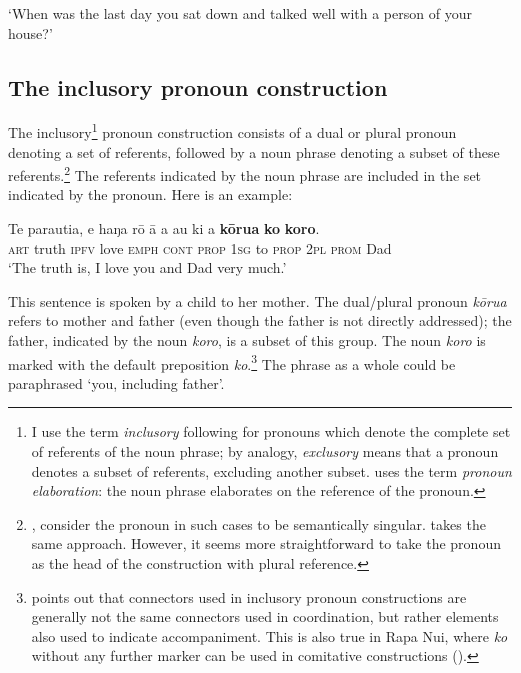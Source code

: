 \glt 
‘When was the last day you sat down and talked well with a person of your house?’ \textstyleExampleref{[R209.032]} 
\z

\subsection{The inclusory pronoun construction}\label{sec:8.10.7}
The inclusory\footnote{\label{fn:449}I use the term \textit{inclusory} following \citet{Lichtenberk2000} for pronouns which denote the complete set of referents of the noun phrase; by analogy, \textit{exclusory} means that a pronoun denotes a subset of referents, excluding another subset. \citet[207]{Dixon2010-2} uses the term \textit{pronoun elaboration}: the noun phrase elaborates on the reference of the pronoun.} pronoun construction consists of a dual or plural pronoun denoting a set of referents, followed by a noun phrase denoting a subset of these referents.\footnote{\label{fn:450}\citet[267]{AndersonKeenan1985}, consider the pronoun in such cases to be semantically singular. \citet{Schwartz1988} takes the same approach. However, it seems more straightforward to take the pronoun as the head of the construction with plural reference.}  The referents indicated by the noun phrase are included in the set indicated by the pronoun. Here is an example:

\ea\label{ex:8.211}
\gll Te parauti{\ꞌ}a, e haŋa rō {\ꞌ}ā a au ki a \textbf{kōrua} \textbf{ko} \textbf{koro}. \\
\textsc{art} truth \textsc{ipfv} love \textsc{emph} \textsc{cont} \textsc{prop} \textsc{1sg} to \textsc{prop} \textsc{2pl} \textsc{prom} Dad \\

\glt
‘The truth is, I love you and Dad very much.’ \textstyleExampleref{[R229.498]} 
\z

This sentence is spoken by a child to her mother. The dual/plural pronoun \textit{kōrua} refers to mother and father (even though the father is not directly addressed); the father, indicated by the noun \textit{koro}, is a subset of this group. The noun \textit{koro} is marked with the default preposition \textit{ko}.\footnote{\label{fn:451}\citet[241]{Schwartz1988} points out that connectors used in inclusory pronoun constructions are generally not the same connectors used in coordination, but rather elements also used to indicate accompaniment. This is also true in Rapa Nui, where \textit{ko} without any further marker can be used in comitative constructions ().} The phrase as a whole could be paraphrased ‘you, including father’. 

